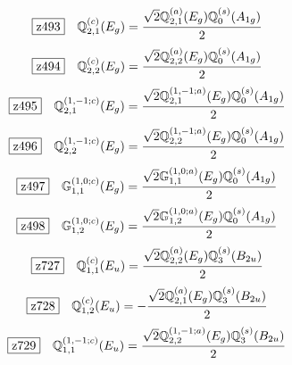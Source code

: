 \documentclass[fleqn,10pt,landscape]{jsarticle}
\begin{document}
\begin{dmath*}
\hspace*{3mm}\fbox{z493}\quad \mathbb{Q}_{2,1}^{(c)}(E_{g})=\frac{\sqrt{2} \mathbb{Q}_{2,1}^{(a)}(E_{g}) \mathbb{Q}_{0}^{(s)}(A_{1g})}{2}
\end{dmath*}
\begin{dmath*}
\hspace*{3mm}\fbox{z494}\quad \mathbb{Q}_{2,2}^{(c)}(E_{g})=\frac{\sqrt{2} \mathbb{Q}_{2,2}^{(a)}(E_{g}) \mathbb{Q}_{0}^{(s)}(A_{1g})}{2}
\end{dmath*}
\begin{dmath*}
\hspace*{3mm}\fbox{z495}\quad \mathbb{Q}_{2,1}^{(1,-1;c)}(E_{g})=\frac{\sqrt{2} \mathbb{Q}_{2,1}^{(1,-1;a)}(E_{g}) \mathbb{Q}_{0}^{(s)}(A_{1g})}{2}
\end{dmath*}
\begin{dmath*}
\hspace*{3mm}\fbox{z496}\quad \mathbb{Q}_{2,2}^{(1,-1;c)}(E_{g})=\frac{\sqrt{2} \mathbb{Q}_{2,2}^{(1,-1;a)}(E_{g}) \mathbb{Q}_{0}^{(s)}(A_{1g})}{2}
\end{dmath*}
\begin{dmath*}
\hspace*{3mm}\fbox{z497}\quad \mathbb{G}_{1,1}^{(1,0;c)}(E_{g})=\frac{\sqrt{2} \mathbb{G}_{1,1}^{(1,0;a)}(E_{g}) \mathbb{Q}_{0}^{(s)}(A_{1g})}{2}
\end{dmath*}
\begin{dmath*}
\hspace*{3mm}\fbox{z498}\quad \mathbb{G}_{1,2}^{(1,0;c)}(E_{g})=\frac{\sqrt{2} \mathbb{G}_{1,2}^{(1,0;a)}(E_{g}) \mathbb{Q}_{0}^{(s)}(A_{1g})}{2}
\end{dmath*}
\begin{dmath*}
\hspace*{3mm}\fbox{z727}\quad \mathbb{Q}_{1,1}^{(c)}(E_{u})=\frac{\sqrt{2} \mathbb{Q}_{2,2}^{(a)}(E_{g}) \mathbb{Q}_{3}^{(s)}(B_{2u})}{2}
\end{dmath*}
\begin{dmath*}
\hspace*{3mm}\fbox{z728}\quad \mathbb{Q}_{1,2}^{(c)}(E_{u})=- \frac{\sqrt{2} \mathbb{Q}_{2,1}^{(a)}(E_{g}) \mathbb{Q}_{3}^{(s)}(B_{2u})}{2}
\end{dmath*}
\begin{dmath*}
\hspace*{3mm}\fbox{z729}\quad \mathbb{Q}_{1,1}^{(1,-1;c)}(E_{u})=\frac{\sqrt{2} \mathbb{Q}_{2,2}^{(1,-1;a)}(E_{g}) \mathbb{Q}_{3}^{(s)}(B_{2u})}{2}
\end{dmath*}
\end{document}
